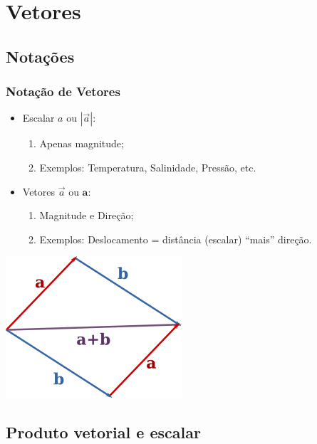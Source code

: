 \section{Vetores}

\subsection{Notações}
\begin{frame}
\frametitle{Notação de Vetores}

  \begin{itemize}[<+-| alert@+>]
    \item Escalar $a$ ou $|\vec{a}|$:

    \begin{enumerate}[<+-| alert@+>]
      \item Apenas magnitude;
      \item Exemplos: Temperatura, Salinidade, Pressão, etc.
    \end{enumerate}

    \item Vetores $\vec{a}$ ou $\mathbf{a}$:

    \begin{enumerate}[<+-| alert@+>]
      \item Magnitude e Direção;
      \item Exemplos: Deslocamento = distância (escalar) ``mais'' direção.
    \end{enumerate}
  \end{itemize}
  \pause
    \begin{center}
      \includegraphics[scale=0.4]{./figures/vector_addition.png}
    \end{center}
\end{frame}


\subsection{Produto vetorial e escalar}

